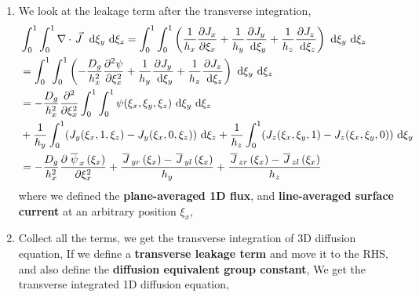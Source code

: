 \documentclass{school-22.211-notes}
\begin{document}
\begin{enumerate}
\begin{enumerate}
  \item We look at the leakage term after the transverse integration, 
    \begin{align}
      &\int_0^1 \int_0^1 \nabla \cdot \left.\vec{J}\right. \mbox{ }\mathrm{d} \xi_y \mbox{ }\mathrm{d} \xi_z = \int_0^1 \int_0^1 \left( \frac{1}{h_x} \frac{\partial J_x}{\partial \xi_x} + \frac{1}{h_y} \frac{\partial J_y}{\mbox{ }\mathrm{d} \xi_y} + \frac{1}{h_z} \frac{\partial J_z}{\mbox{ }\mathrm{d} \xi_z} \right) \mbox{ }\mathrm{d} \xi_y \mbox{ }\mathrm{d} \xi_z \\
      &= \int_0^1 \int_0^1 \left( -\frac{D_g}{h_x^2} \frac{\partial^2 \psi}{\partial \xi_x^2} + \frac{1}{h_y} \frac{\partial J_y}{\mbox{ }\mathrm{d} \xi_y} + \frac{1}{h_z} \frac{\partial J_z}{\mbox{ }\mathrm{d} \xi_z} \right) \mbox{ }\mathrm{d} \xi_y \mbox{ }\mathrm{d} \xi_z \\
      &= - \frac{D_g}{h_x^2} \frac{\partial^2 }{\partial \xi_x^2} \int_0^1 \int_0^1 \psi(\xi_x, \xi_y, \xi_z) \mbox{ }\mathrm{d} \xi_y \mbox{ }\mathrm{d} \xi_z \\
      &+ \frac{1}{h_y} \int_0^1 (J_y(\xi_x, 1, \xi_z) - J_y(\xi_x, 0, \xi_z) )\mbox{ }\mathrm{d} \xi_z + \frac{1}{h_z} \int_0^1 (J_z(\xi_x, \xi_y, 1) - J_z(\xi_x, \xi_y, 0) ) \mbox{ }\mathrm{d} \xi_y \\
      &= - \frac{D_g}{h_x^2} \frac{\partial \left.\overline{\psi} \right._x (\xi_x)}{\partial \xi_x^2} + \frac{\left.\overline{J} \right._{yr}(\xi_x) - \left.\overline{J} \right._{yl} (\xi_x)}{h_y} + \frac{\left.\overline{J} \right._{zr} (\xi_x) - \left.\overline{J} \right._{zl} (\xi_x)}{h_z} 
    \end{align}
    where we defined the \textbf{plane-averaged 1D flux},
    and \textbf{line-averaged surface current} at an arbitrary position $\xi_x$, 

  \item Collect all the terms, we get the transverse integration of 3D diffusion equation, 
    If we define a \textbf{transverse leakage term} and move it to the RHS, 
    and also define the \textbf{diffusion equivalent group constant}, 
    We get the transverse integrated 1D diffusion equation,


\end{enumerate}
\end{enumerate}
\end{document}
